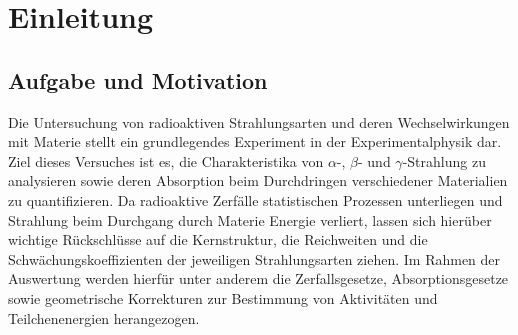 \chapter{Einleitung} \label{ch:Einleitung}

\section{Aufgabe und Motivation}
\label{sec:AuM}
Die Untersuchung von radioaktiven Strahlungsarten und deren Wechselwirkungen mit Materie stellt ein grundlegendes Experiment in der Experimentalphysik dar. Ziel dieses Versuches ist es, die Charakteristika von $\alpha$-, $\beta$- und $\gamma$-Strahlung zu analysieren sowie deren Absorption beim Durchdringen verschiedener Materialien zu quantifizieren. Da radioaktive Zerfälle statistischen Prozessen unterliegen und Strahlung beim Durchgang durch Materie Energie verliert, lassen sich hierüber wichtige Rückschlüsse auf die Kernstruktur, die Reichweiten und die Schwächungskoeffizienten der jeweiligen Strahlungsarten ziehen. Im Rahmen der Auswertung werden hierfür unter anderem die Zerfallsgesetze, Absorptionsgesetze sowie geometrische Korrekturen zur Bestimmung von Aktivitäten und Teilchenenergien herangezogen.

